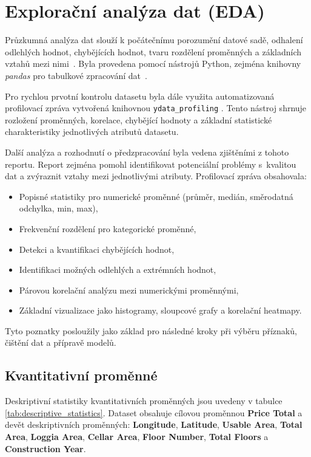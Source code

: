 \section{Explorační analýza dat (EDA)}
Průzkumná analýza dat slouží k počátečnímu porozumění datové sadě, odhalení odlehlých hodnot, chybějících hodnot, tvaru rozdělení proměnných a základních vztahů mezi nimi~\cite{Tukey1977EDA}. Byla provedena pomocí nástrojů Python, zejména knihovny \textit{pandas} pro tabulkové zpracování dat~\cite{McKinney2010Pandas}.

Pro rychlou prvotní kontrolu datasetu byla dále využita automatizovaná profilovací zpráva vytvořená knihovnou \verb|ydata_profiling| \cite{YdataProfiling}. Tento nástroj shrnuje rozložení proměnných, korelace, chybějící hodnoty a základní statistické charakteristiky jednotlivých atributů datasetu.

Další analýza a rozhodnutí o předzpracování byla vedena zjištěními z tohoto reportu. Report zejména pomohl identifikovat potenciální problémy s~kvalitou dat a zvýraznit vztahy mezi jednotlivými atributy.
Profilovací zpráva obsahovala:
\begin{itemize}
\item Popisné statistiky pro numerické proměnné (průměr, medián, směrodatná odchylka, min, max),
\item Frekvenční rozdělení pro kategorické proměnné,
\item Detekci a kvantifikaci chybějících hodnot,
\item Identifikaci možných odlehlých a extrémních hodnot,
\item Párovou korelační analýzu mezi numerickými proměnnými,
\item Základní vizualizace jako histogramy, sloupcové grafy a korelační heatmapy.
\end{itemize}

Tyto poznatky posloužily jako základ pro následné kroky při výběru příznaků, čištění dat a přípravě modelů.

\subsection{Kvantitativní proměnné}
Deskriptivní statistiky kvantitativních proměnných jsou uvedeny v tabulce \ref{tab:descriptive_statistics}.
Dataset obsahuje cílovou proměnnou \textbf{Price Total} a devět deskriptivních proměnných: \textbf{Longitude}, \textbf{Latitude}, \textbf{Usable Area}, \textbf{Total Area}, \textbf{Loggia Area}, \textbf{Cellar Area}, \textbf{Floor Number}, \textbf{Total Floors} a \textbf{Construction Year}.

